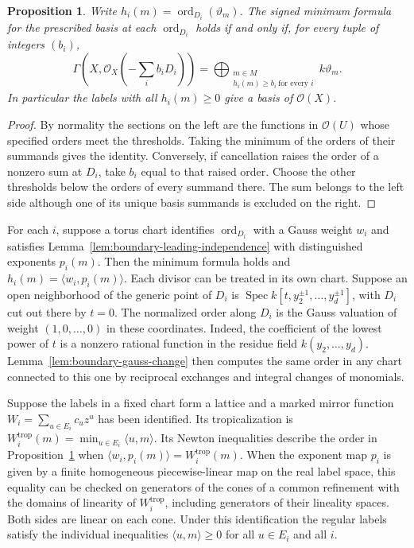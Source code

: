 \documentclass[11pt,reqno]{amsart}
\numberwithin{equation}{section}
\newtheorem{proposition}[theorem]{Proposition}
\theoremstyle{definition}
\theoremstyle{remark}
\DeclareMathOperator{\Spec}{Spec}
\DeclareMathOperator{\ord}{ord}
\begin{document}
\begin{proposition}\label{prop:boundary-extension}
Write \(h_i(m)=\ord_{D_i}(\vartheta_m)\). The signed minimum formula
for the prescribed basis at each \(\ord_{D_i}\) holds if and only if,
for every tuple of integers \((b_i)\),
\[ \Gamma\!\left(X,\mathcal O_X\!\left(-\sum_i b_iD_i\right)\right) =\bigoplus_{\substack{m\in M\\ h_i(m)\ge b_i\ \text{for every }i}} k\vartheta_m . \]
In particular the labels with all \(h_i(m)\ge0\) give a basis of
\(\mathcal O(X)\).
\end{proposition}
\begin{proof}
By normality the sections on the left are the functions in
\(\mathcal O(U)\) whose specified orders meet the thresholds.
Taking the minimum of the orders of their summands gives the identity.
Conversely, if cancellation raises the order of a nonzero sum at
\(D_i\), take \(b_i\) equal to that raised order. Choose the other
thresholds below the orders of every summand there. The sum belongs to
the left side although one of its unique basis summands is excluded
on the right.
\end{proof}

For each \(i\), suppose a torus chart identifies \(\ord_{D_i}\) with
a Gauss weight \(w_i\) and satisfies Lemma~\ref{lem:boundary-leading-independence}
with distinguished exponents \(p_i(m)\). Then the minimum formula
holds and \(h_i(m)=\langle w_i,p_i(m)\rangle\). Each divisor can be
treated in its own chart. Suppose an open
neighborhood of the generic point of \(D_i\) is
\(\Spec  k[t,y_2^{\pm1},\ldots,y_d^{\pm1}]\), with
\(D_i\) cut out there by \(t=0\). The normalized order along \(D_i\)
is the Gauss valuation of weight \((1,0,\ldots,0)\) in these
coordinates. Indeed, the coefficient of the lowest power of \(t\) is a
nonzero rational function in the residue field
\(k(y_2,\ldots,y_d)\). Lemma~\ref{lem:boundary-gauss-change} then
computes the same order in any chart connected to this one by reciprocal
exchanges and integral changes of monomials.

Suppose the labels in a fixed chart form a lattice and a marked mirror
function \(W_i=\sum_{u\in E_i}c_u z^u\) has been identified. Its
tropicalization is \(W_i^{\mathrm{trop}}(m)=
\min_{u\in E_i}\langle u,m\rangle\). Its Newton inequalities describe the order in
Proposition~\ref{prop:boundary-extension} when
\(\langle w_i,p_i(m)\rangle=W_i^{\mathrm{trop}}(m)\).
When the exponent map \(p_i\) is given by a finite homogeneous
piecewise-linear map on the real label space, this equality can be checked
on generators of the cones of a common refinement with the domains of
linearity of \(W_i^{\mathrm{trop}}\), including generators of their
lineality spaces. Both sides are linear on each cone. Under this
identification the regular labels satisfy the individual inequalities
\(\langle u,m\rangle\ge0\) for all \(u\in E_i\) and all \(i\).
\end{document}
